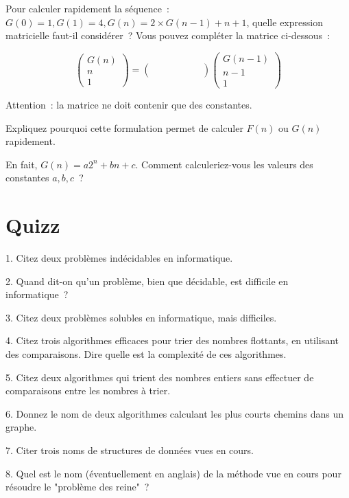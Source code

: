 \documentclass[11pt]{article}
\begin{document}
Pour calculer rapidement la séquence~: $G(0)=1, G(1)=4, G(n)=2\times G(n-1)+n+1$, quelle expression matricielle faut-il considérer~? Vous pouvez compléter la matrice ci-dessous~:

$$
 \left( \begin{array}{c}
G(n) \\
n\\
1\end{array}\right) = \left( \begin{array}{ccc}
\quad & \quad & \quad \\
\quad & \quad & \quad \\
\quad & \quad & \quad \end{array}\right) \left(\begin{array}{c} G(n-1) \\
n-1\\
1\end{array}\right)
$$

Attention~: la matrice ne doit contenir que des constantes.

Expliquez pourquoi cette formulation permet de calculer $F(n)$ ou $G(n)$ rapidement.

En fait, $G(n)=a 2^n +b n + c$. Comment calculeriez-vous
les valeurs des constantes $a, b, c$~?



\section{Quizz}

1. Citez deux problèmes indécidables en informatique.

2. Quand dit-on qu'un problème, bien que décidable, est difficile en informatique~?


3. Citez deux problèmes solubles en informatique, mais difficiles.

4. Citez  trois algorithmes efficaces pour trier des nombres flottants, en utilisant des comparaisons. Dire quelle est la complexité de ces algorithmes.

5. Citez deux  algorithmes  qui trient des nombres entiers sans effectuer de comparaisons entre les nombres à trier.

6. Donnez le nom de deux algorithmes calculant les plus courts chemins dans un graphe.

7. Citer trois noms de structures de données vues en cours.

8. Quel est le nom (éventuellement en anglais) de la méthode vue en cours pour résoudre le "problème des reine"~? 
\end{document}
